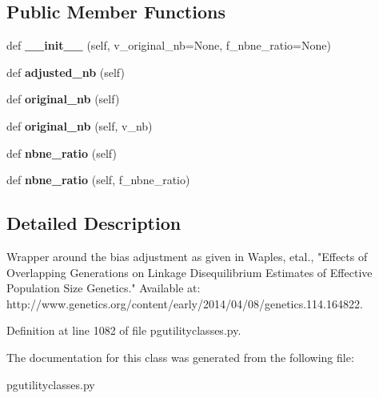 \subsection*{Public Member Functions}
\begin{DoxyCompactItemize}
\item 
def {\bfseries \+\_\+\+\_\+init\+\_\+\+\_\+} (self, v\+\_\+original\+\_\+nb=None, f\+\_\+nbne\+\_\+ratio=None)\hypertarget{classnegui_1_1pgutilityclasses_1_1LDNENbBiasAdjustor_a4a55145de8b56fe28a8fe743b5f2bca0}{}\label{classnegui_1_1pgutilityclasses_1_1LDNENbBiasAdjustor_a4a55145de8b56fe28a8fe743b5f2bca0}

\item 
def {\bfseries adjusted\+\_\+nb} (self)\hypertarget{classnegui_1_1pgutilityclasses_1_1LDNENbBiasAdjustor_a68d259290d69c96c16b0f7231c928306}{}\label{classnegui_1_1pgutilityclasses_1_1LDNENbBiasAdjustor_a68d259290d69c96c16b0f7231c928306}

\item 
def {\bfseries original\+\_\+nb} (self)\hypertarget{classnegui_1_1pgutilityclasses_1_1LDNENbBiasAdjustor_a7ce9a8792818a6a187d9aca9689d3c0e}{}\label{classnegui_1_1pgutilityclasses_1_1LDNENbBiasAdjustor_a7ce9a8792818a6a187d9aca9689d3c0e}

\item 
def {\bfseries original\+\_\+nb} (self, v\+\_\+nb)\hypertarget{classnegui_1_1pgutilityclasses_1_1LDNENbBiasAdjustor_add7013606409d902879674323bd7b0c4}{}\label{classnegui_1_1pgutilityclasses_1_1LDNENbBiasAdjustor_add7013606409d902879674323bd7b0c4}

\item 
def {\bfseries nbne\+\_\+ratio} (self)\hypertarget{classnegui_1_1pgutilityclasses_1_1LDNENbBiasAdjustor_afd9f80d46c3fd89e3e38ae8ef1f3d71a}{}\label{classnegui_1_1pgutilityclasses_1_1LDNENbBiasAdjustor_afd9f80d46c3fd89e3e38ae8ef1f3d71a}

\item 
def {\bfseries nbne\+\_\+ratio} (self, f\+\_\+nbne\+\_\+ratio)\hypertarget{classnegui_1_1pgutilityclasses_1_1LDNENbBiasAdjustor_a1751127c7311f26ae36b083963591d7b}{}\label{classnegui_1_1pgutilityclasses_1_1LDNENbBiasAdjustor_a1751127c7311f26ae36b083963591d7b}

\end{DoxyCompactItemize}


\subsection{Detailed Description}
\begin{DoxyVerb}Wrapper around the bias adjustment as given in 
Waples, etal., "Effects of Overlapping Generations on Linkage 
Disequilibrium Estimates of Effective Population Size Genetics." 
Available at: 
http://www.genetics.org/content/early/2014/04/08/genetics.114.164822.
\end{DoxyVerb}
 

Definition at line 1082 of file pgutilityclasses.\+py.



The documentation for this class was generated from the following file\+:\begin{DoxyCompactItemize}
\item 
pgutilityclasses.\+py\end{DoxyCompactItemize}
